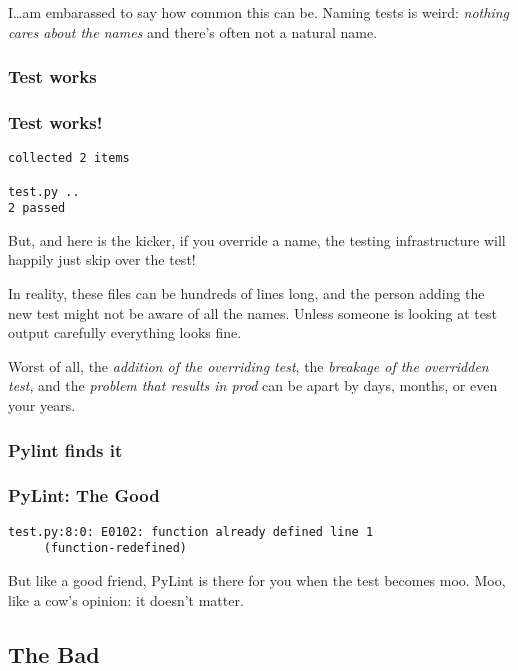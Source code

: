 \documentclass{article}
\begin{document}
I\ldots am embarassed to say how common this can be. Naming tests is
weird: \emph{nothing cares about the names} and there's often not a
natural name.

\hypertarget{test-works}{%
\subsubsection{Test works}\label{test-works}}

\begin{frame}[fragile]
\frametitle{Test works!}

\begin{lstlisting}
collected 2 items                                                                         

test.py .. 
2 passed 
\end{lstlisting}

\end{frame}

But, and here is the kicker, if you override a name, the testing
infrastructure will happily just skip over the test!

In reality, these files can be hundreds of lines long, and the person
adding the new test might not be aware of all the names. Unless someone
is looking at test output carefully everything looks fine.

Worst of all, the \emph{addition of the overriding test}, the
\emph{breakage of the overridden test}, and the \emph{problem that
results in prod} can be apart by days, months, or even your years.

\hypertarget{pylint-finds-it}{%
\subsubsection{Pylint finds it}\label{pylint-finds-it}}

\begin{frame}[fragile]
\frametitle{PyLint: The Good}

\begin{lstlisting}
test.py:8:0: E0102: function already defined line 1
     (function-redefined)
\end{lstlisting}

\end{frame}

But like a good friend, PyLint is there for you when the test becomes
moo. Moo, like a cow's opinion: it doesn't matter.

\hypertarget{the-bad}{%
\subsection{The Bad}\label{the-bad}}
\end{document}
